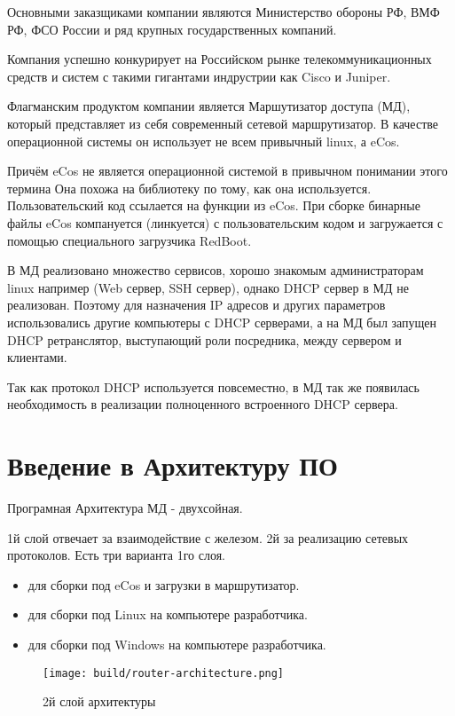 \documentclass[14pt,a4paper]{extarticle}
\begin{document}
Основными заказщиками компании являются Министерство обороны РФ, ВМФ РФ, ФСО России и ряд крупных государственных компаний.

Компания успешно конкурирует на Российском рынке телекоммуникационных средств и систем с такими гигантами индрустрии как Cisco и Juniper.

Флагманским продуктом компании является Маршутизатор доступа (МД), который представляет из себя современный сетевой маршрутизатор. В качестве операционной системы он использует не всем привычный linux, а eCos.

Причём eCos не является операционной системой в привычном понимании этого термина Она похожа на библиотеку по тому, как она используется. Пользовательский код ссылается на функции из eCos. При сборке бинарные файлы eCos компануется (линкуется) с пользовательским кодом и загружается с помощью специального загрузчика RedBoot.

В МД реализовано множество сервисов, хорошо знакомым администраторам linux например (Web сервер, SSH сервер), однако DHCP сервер в МД не реализован. Поэтому для назначения IP адресов и других параметров использовались другие компьютеры с DHCP серверами, а на МД был запущен DHCP ретранслятор, выступающий роли посредника, между сервером и клиентами.

Так как протокол DHCP используется повсеместно, в МД так же появилась необходимость в реализации полноценного встроенного DHCP сервера.

\pagebreak
\section{Введение в Архитектуру ПО}

Програмная Архитектура МД - двухсойная.

1й слой отвечает за взаимодействие с железом. 2й за реализацию сетевых протоколов.
Есть три варианта 1го слоя. \cite{md-docs}

\begin{itemize}
    \item для сборки под eCos и загрузки в маршрутизатор.
    \item для сборки под Linux на компьютере разработчика.
    \item для сборки под Windows на компьютере разработчика.
\end{itemize}

\begin{figure}[H]
    \texttt{[image: build/router-architecture.png]}
    \caption{2й слой архитектуры}
\end{figure}
\end{document}
